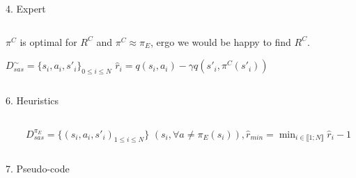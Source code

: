\documentclass[xcolor=x11names,12pt]{beamer}
\newcommand{\classifpolicy}{\pi^C}
\newcommand{\Rc}{R^C}
\newcommand{\actionBis}{a}
\newcommand{\datasetindex}{i}
\newcommand{\nbsamples}{N}
\newcommand{\rsample}{\hat{r}}
\newcommand{\state}{s}
\newcommand{\expertpolicy}{\pi_E}
\newcommand{\sastrace}[1]{D^{#1}_{sas}}
\begin{document}
\begin{frame}
\begin{columns}
\begin{column}{.48\textwidth}
\begin{block}{4. Expert}
\begin{columns}
\begin{column}{\textwidth}
\vspace{1em}
$\classifpolicy$ is optimal for $\Rc$ and $\classifpolicy \approx \expertpolicy$, ergo we would be happy to find $\Rc$.
\vspace{1em}

$\sastrace{\sim} = \{\state_{\datasetindex},\actionBis_{\datasetindex},\state'_{\datasetindex}\}_{0\leq\datasetindex\leq\nbsamples}$\hspace{12em}
$\rsample_{\datasetindex} = q(s_{\datasetindex},a_{\datasetindex}) - \gamma q(s'_{\datasetindex},\classifpolicy(s'_{\datasetindex}))$ 
        \end{column}
      \end{columns}
    \end{block}
    \vspace{1cm}
    \begin{block}{6. Heuristics}
      \begin{columns}
        \begin{column}{0.001\textwidth}
          \vspace{8cm}
        \end{column}
        \begin{column}{\textwidth}
          $\sastrace{\expertpolicy} = \{(s_i,a_i,s'_i)_{1\leq i \leq N}\}$ \hspace{5em} $\left(s_{\datasetindex},\forall \actionBis \neq\expertpolicy(\state_{\datasetindex})\right) ,\rsample_{min} = \min_{\datasetindex\in \llbracket 1;\nbsamples\rrbracket}\rsample_{\datasetindex} - 1$
        \end{column}
      \end{columns}             
    \end{block}
    \vspace{1cm}
    \vfill
    \begin{block}{7. Pseudo-code}
      \resizebox{.95\columnwidth}{!}{

}
\end{block}
\end{column}
\end{columns}
\end{frame}
\end{document}
